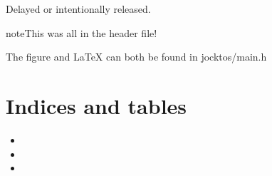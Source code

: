 \documentclass[letterpaper,10pt,english]{sphinxmanual}
\begin{document}
\begin{fulllineitems}
\begin{fulllineitems}
\end{fulllineitems}


\begin{fulllineitems}
\label{\detokenize{source_code:_CPPv4N17jocktos_TaskState9SUSPENDEDE}}\label{\detokenize{source_code:_CPPv3N17jocktos_TaskState9SUSPENDEDE}}\label{\detokenize{source_code:_CPPv2N17jocktos_TaskState9SUSPENDEDE}}
\pysigstartsignatures
\pysigstartmultiline
{}
\pysigstopmultiline
\pysigstopsignatures
\sphinxAtStartPar
Delayed or intentionally released. 

\end{fulllineitems}


\end{fulllineitems}


\begin{sphinxadmonition}{note}{This was all in the header file!}

\sphinxAtStartPar
The figure and LaTeX can both be found in jocktos/main.h
\end{sphinxadmonition}


\chapter{Indices and tables}
\label{\detokenize{index:indices-and-tables}}\begin{itemize}
\item {} 
\sphinxAtStartPar
{}

\item {} 
\sphinxAtStartPar
{}

\item {} 
\sphinxAtStartPar
{}

\end{itemize}



\renewcommand{\indexname}{Index}
\printindex
\end{document}
